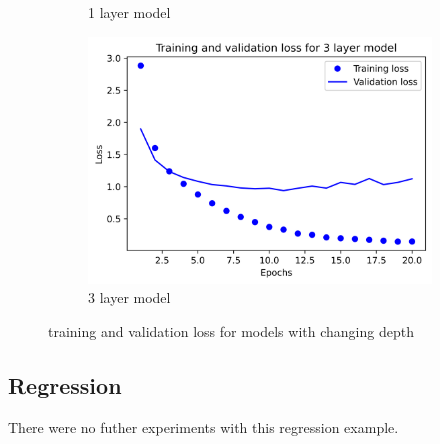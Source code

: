 \documentclass{article}
\begin{document}
\begin{figure}[H]
\begin{subfigure}{.5\textwidth}
            \caption{1 layer model}
            \label{fig5:sfig2}
        \end{subfigure}
        \begin{subfigure}{.5\textwidth}
            \centering
            \includegraphics[width=\linewidth]{images/reuters/5.png}
            \caption{3 layer model}
            \label{fig5:sfig3}
        \end{subfigure}
        \caption{training and validation loss for models with changing depth}
        \label{fig5:fig}
    \end{figure}


    \subsection{Regression}
        There were no futher experiments with this regression example.
\end{document}
